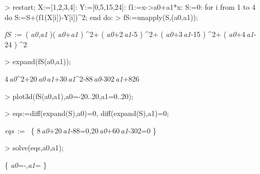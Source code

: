 \begin{MapleInput}
> restart; X:=[1,2,3,4]: Y:=[0,5,15,24]: f1:=x->a0+a1*x:
  S:=0: 
  for i from 1 to 4 do 
    S:=S+(f1(X[i])-Y[i])^2; 
  end do:
> fS:=unapply(S,(a0,a1));
\end{MapleInput}
\begin{MapleOutput}
{\it fS}\, := \,( {{\it a0},{\it a1}} )\mapsto  \left( {\it a0}+{\it a1} \right) ^{2}+ \left( {\it a0}+2\,{\it a1}-5 \right) ^{2}+ \left( {\it a0}+3\,{\it a1}-15 \right) ^{2}+ \left( {\it a0}+4\,{\it a1}-24 \right) ^{2}
\end{MapleOutput}
\begin{MapleInput}
> expand(fS(a0,a1));
\end{MapleInput}
\begin{MapleOutput}
4\,{{\it a0}}^{2}+20\,{\it a0}\,{\it a1}+30\,{{\it a1}}^{2}-88\,{\it a0}-302\,{\it a1}+826
\end{MapleOutput}

\begin{MapleInput}
> plot3d(fS(a0,a1),a0=-20..20,a1=0..20);
\end{MapleInput}


\begin{MapleInput}
> eqs:={diff(expand(S),a0)=0, diff(expand(S),a1)=0};
\end{MapleInput}
\begin{MapleOutput}
{\it eqs}\, := \, \left\{ 8\,{\it a0}+20\,{\it a1}-88=0,20\,{\it a0}+60\,{\it a1}-302=0 \right\}
\end{MapleOutput}

\begin{MapleInput}
> solve(eqs,{a0,a1});
\end{MapleInput}
\begin{MapleOutput}
\left\{ {\it a0}=-,{\it a1}={} \right\}
\end{MapleOutput}
